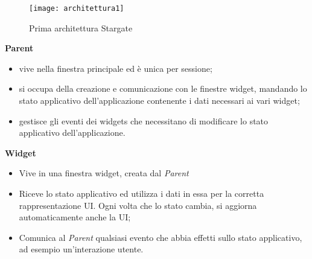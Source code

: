 \begin{figure}[H] 
  \centering 
  \texttt{[image: architettura1]} 
  \caption{Prima architettura Stargate}
\end{figure}

\textbf{Parent}
    \begin{itemize}
        \item vive nella finestra principale ed è unica per sessione;
        \item si occupa della creazione e comunicazione con le finestre widget, mandando lo stato applicativo dell'applicazione contenente i dati necessari ai vari widget;
        \item gestisce gli eventi dei widgets che necessitano di modificare lo stato applicativo dell'applicazione.
    \end{itemize}
\textbf{Widget}
    \begin{itemize}
        \item Vive in una finestra widget, creata dal \textit{Parent}
        \item Riceve lo stato applicativo ed utilizza i dati in essa per la corretta rappresentazione UI. Ogni volta che lo stato cambia, si aggiorna automaticamente anche la UI;
        \item Comunica al \textit{Parent} qualsiasi evento che abbia effetti sullo stato applicativo, ad esempio un'interazione utente.
    \end{itemize}
